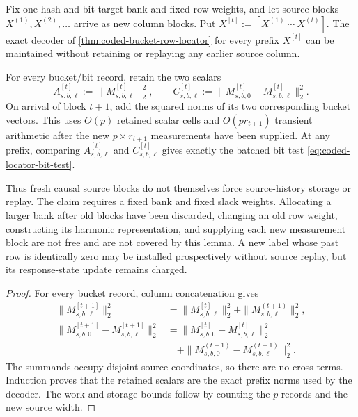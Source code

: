 \begin{lemma}
\label{lem:append-only-bucket-norm-accumulation}
Fix one hash-and-bit target bank and fixed row weights, and let source blocks
$X^{(1)},X^{(2)},\ldots$ arrive as new column blocks.  Put
$X^{[t]}:=[X^{(1)}\ \cdots\ X^{(t)}]$.  The exact decoder of
\cref{thm:coded-bucket-row-locator} for every prefix $X^{[t]}$ can be
maintained without retaining or replaying any earlier source column.

For every bucket/bit record, retain the two scalars
\begin{equation*}
 A_{s,b,\ell}^{[t]}:=\|M_{s,b,\ell}^{[t]}\|_2^2,
 \qquad
 C_{s,b,\ell}^{[t]}
 :=\|M_{s,b,0}^{[t]}-M_{s,b,\ell}^{[t]}\|_2^2.
\end{equation*}
On arrival of block $t+1$, add the squared norms of its two corresponding
bucket vectors.  This uses $O(p)$ retained scalar cells and
$O(pr_{t+1})$ transient arithmetic after the new $p\times r_{t+1}$
measurements have been supplied.  At any prefix, comparing
$A_{s,b,\ell}^{[t]}$ and $C_{s,b,\ell}^{[t]}$ gives exactly the batched bit
test \cref{eq:coded-locator-bit-test}.

Thus fresh causal source blocks do not themselves force source-history
storage or replay.  The claim requires a fixed bank and fixed slack weights.
Allocating a larger bank after old blocks have been discarded, changing an
old row weight, constructing its harmonic representation, and supplying each
new measurement block are not free and are not covered by this lemma.  A new
label whose past row is identically zero may be installed prospectively
without source replay, but its response-state update remains charged.
\end{lemma}

\begin{proof}
For every bucket record, column concatenation gives
\begin{align*}
 \|M_{s,b,\ell}^{[t+1]}\|_2^2
 &=\|M_{s,b,\ell}^{[t]}\|_2^2
   +\|M_{s,b,\ell}^{(t+1)}\|_2^2,\\
 \|M_{s,b,0}^{[t+1]}-M_{s,b,\ell}^{[t+1]}\|_2^2
 &=\|M_{s,b,0}^{[t]}-M_{s,b,\ell}^{[t]}\|_2^2\\
 &\quad+
   \|M_{s,b,0}^{(t+1)}-M_{s,b,\ell}^{(t+1)}\|_2^2.
\end{align*}
The summands occupy disjoint source coordinates, so there are no cross terms.
Induction proves that the retained scalars are the exact prefix norms used by
the decoder.  The work and storage bounds follow by counting the $p$ records
and the new source width.
\end{proof}

